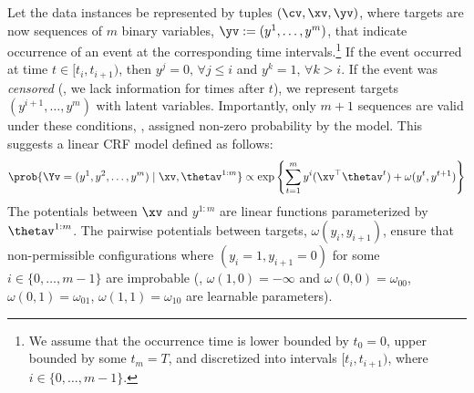 \documentclass[twoside,11pt]{article}
\begin{document}
Let the data instances be represented by tuples $(\cv, \xv, \yv)$, where targets are now sequences of $m$ binary variables, $\yv := (y^1, \dots, y^m)$, that indicate occurrence of an event at the corresponding time intervals.\footnote{We assume that the occurrence time is lower bounded by $t_0 = 0$, upper bounded by some $t_m = T$, and discretized into intervals $[t_{i}, t_{i+1})$, where $i \in \{0, \dots, m-1\}$.}
If the event occurred at time $t \in [t_{i}, t_{i+1})$, then $y^j = 0,\, \forall j \leq i$ and $y^k = 1,\, \forall k > i$.
If the event was \emph{censored} (\ie, we lack information for times after $t$), we represent targets $(y^{i+1}, \dots, y^m)$ with latent variables.
Importantly, only $m + 1$ sequences are valid under these conditions, \ie, assigned non-zero probability by the model.
This suggests a linear CRF model defined as follows:
\begin{equation}
    \prob{\Yv = (y^1, y^2, \dots, y^m) \mid \xv, \thetav^{1:m}} \propto
    \exp\left\{\sum_{t=1}^m y^i (\xv^\top \thetav^t) + \omega(y^t, y^{t + 1})\right\}
\end{equation}
The potentials between  $\xv$ and $y^{1:m}$ are linear functions parameterized by $\thetav^{1:m}$.
The pairwise potentials between targets, $\omega(y_i, y_{i + 1})$, ensure that non-permissible configurations where $(y_i = 1, y_{i+1} = 0)$ for some $i \in \{0, \dots, m-1\}$ are improbable (\ie, $\omega(1, 0) = -\infty$ and $\omega(0, 0) = \omega_{00}$, $\omega(0, 1) = \omega_{01}$, $\omega(1, 1) = \omega_{10}$ are learnable parameters).
\end{document}
